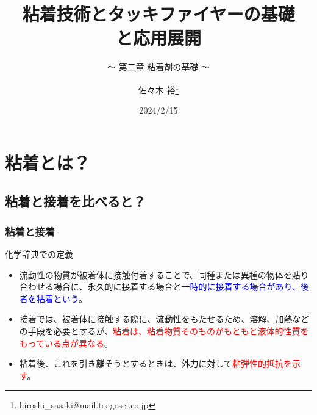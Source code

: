 \documentclass[unicode,12pt]{beamer}%
\title{粘着技術とタッキファイヤーの基礎\\と応用展開}
\subtitle{～ 第二章 粘着剤の基礎 ～}
\author[東亞合成 佐々木]{佐々木 裕\thanks{hiroshi\_sasaki@mail.toagosei.co.jp}}
\institute[東亞合成]{東亞合成株式会社}
\date{2024/2/15}
\begin{document}
\maketitle

\begin{frame} 
    \tableofcontents[]
\end{frame} 


\section{粘着とは？}
\subsection{粘着と接着を比べると？}
\begin{frame}
	\frametitle{粘着と接着}
		\begin{block}{化学辞典での定義}
			\begin{itemize}
				\item 流動性の物質が被着体に接触付着することで、同種または異種の物体を貼り合わせる場合に、永久的に接着する場合と\textcolor{blue}{一時的に接着する場合があり、後者を粘着という}。
				\item 接着では、被着体に接触する際に、流動性をもたせるため、溶解、加熱などの手段を必要とするが、\textcolor{red}{粘着は、粘着物質そのものがもともと液体的性質をもっている点が異なる}。
				\item 粘着後、これを引き離そうとするときは、外力に対して\textcolor{red}{粘弾性的抵抗を示す}。
			\end{itemize}
		\end{block}
\end{frame}
\end{document}
